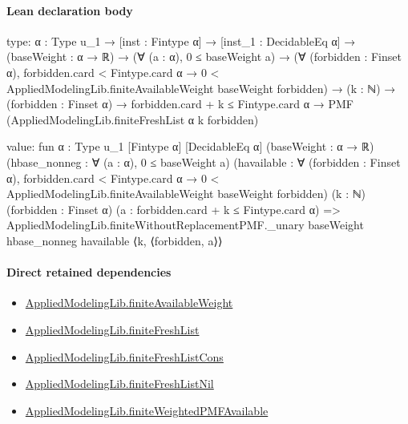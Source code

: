 \documentclass[10pt]{article}
\begin{document}
\paragraph{Lean declaration body}
\begin{ReviewVerbatim}
type:
{α : Type u_1} →
  [inst : Fintype α] →
    [inst_1 : DecidableEq α] →
      (baseWeight : α → ℝ) →
        (∀ (a : α), 0 ≤ baseWeight a) →
          (∀ (forbidden : Finset α),
              forbidden.card < Fintype.card α → 0 < AppliedModelingLib.finiteAvailableWeight baseWeight forbidden) →
            (k : ℕ) →
              (forbidden : Finset α) →
                forbidden.card + k ≤ Fintype.card α → PMF (AppliedModelingLib.finiteFreshList α k forbidden)

value:
fun {α : Type u_1} [Fintype α] [DecidableEq α] (baseWeight : α → ℝ) (hbase_nonneg : ∀ (a : α), 0 ≤ baseWeight a)
    (havailable :
      ∀ (forbidden : Finset α),
        forbidden.card < Fintype.card α → 0 < AppliedModelingLib.finiteAvailableWeight baseWeight forbidden)
    (k : ℕ) (forbidden : Finset α) (a : forbidden.card + k ≤ Fintype.card α) =>
  AppliedModelingLib.finiteWithoutReplacementPMF._unary baseWeight hbase_nonneg havailable ⟨k, ⟨forbidden, a⟩⟩
\end{ReviewVerbatim}

\paragraph{Direct retained dependencies}
\begin{itemize}\raggedright
\item \hyperlink{governing-declaration-fb56bf98331e5b1a}{Applied\allowbreak{}Modeling\allowbreak{}Lib.\allowbreak{}finite\allowbreak{}Available\allowbreak{}Weight}
\item \hyperlink{governing-declaration-9a06ef56935bbfee}{Applied\allowbreak{}Modeling\allowbreak{}Lib.\allowbreak{}finite\allowbreak{}Fresh\allowbreak{}List}
\item \hyperlink{governing-declaration-de7bc5e8638d9199}{Applied\allowbreak{}Modeling\allowbreak{}Lib.\allowbreak{}finite\allowbreak{}Fresh\allowbreak{}List\allowbreak{}Cons}
\item \hyperlink{governing-declaration-b5bc87da9cf4ce3c}{Applied\allowbreak{}Modeling\allowbreak{}Lib.\allowbreak{}finite\allowbreak{}Fresh\allowbreak{}List\allowbreak{}Nil}
\item \hyperlink{governing-declaration-50f34444a5568799}{Applied\allowbreak{}Modeling\allowbreak{}Lib.\allowbreak{}finite\allowbreak{}Weighted\allowbreak{}PMF\allowbreak{}Available}
\end{itemize}
\hypertarget{governing-declaration-8e4b4389a4f6454b}{}
\end{document}
